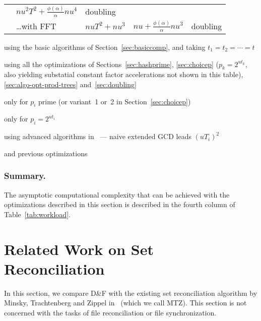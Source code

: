 \documentclass[twoside,envcountsame,runningheads]{llncs}
\newcommand{\df}{D\&F\xspace}
\begin{document}
\begin{table}[t]
\begin{threeparttable}
\begin{tabularx}{\textwidth}{lXC{2.3cm}C{2.5cm}l}
      & $n u^2 T^2 + \frac{\phi(\alpha)}{\alpha} n u^4$
      & doubling \\
      & \dots with FFT
      & $n u T^2 + n u^3$
      & $n u + \frac{\phi(\alpha)}{\alpha} n u^3$
      & doubling \\
\bottomrule
  \end{tabularx}
  \begin{tablenotes}
    \item[a] using the basic algorithms of Section~\ref{sec:basiccomp}, and taking $t_1=t_2=\cdots=t$
    \item[b] using all the optimizations of Sections~\ref{sec:hashprime}, \ref{sec:choicep} ($p_k = 2^{ut_k}$, also yielding substatial constant factor accelerations not shown in this table), \ref{sec:algo-opt-prod-trees} and~\ref{sec:doubling}
    \item[c] only for $p_i$ prime (or variant~1 or~2 in Section~\ref{sec:choicep})
    \item[d] only for $p_i = 2^{ut_i}$
    \item[e] using advanced algorithms in~\cite{pan2004rational,wang2003acceleration} --- naive extended GCD leads $(uT_i)^2$
    \item[f] and previous optimizations\smallskip
  \end{tablenotes}
 \end{threeparttable}
\end{table}

\subsubsection{Summary.}

The asymptotic computational complexity that can be achieved with the optimizations described in this section is described in the fourth column of Table~\ref{tab:workload}.



\section{Related Work on Set Reconciliation}
\label{sec:related-work}

In this section, we compare \df with the existing set reconciliation algorithm by Minsky, Trachtenberg and Zippel in~\cite{Mins1} (which
we call MTZ). This section is not concerned with the tasks of file reconciliation or file
synchronization.
\end{document}
